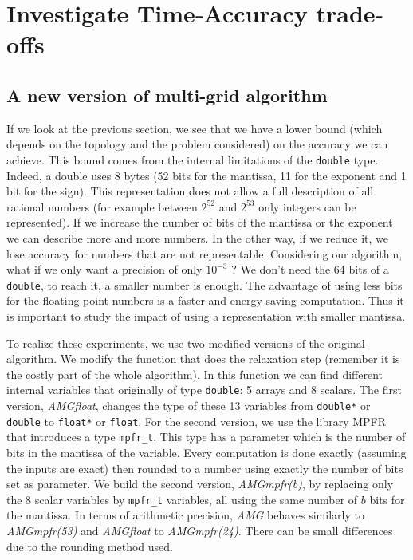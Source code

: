 \documentclass[a4paper,10pt]{article}
\begin{document}
\section{Investigate Time-Accuracy trade-offs}
   
   \subsection{A new version of multi-grid algorithm}
   If we look at the previous section, we see that we have a lower bound (which depends on the topology and the problem considered) on the accuracy we can achieve. This bound comes from the internal limitations of the \texttt{double} type.
   Indeed, a double uses 8 bytes (52 bits for the mantissa, 11 for the exponent and 1 bit for the sign). This representation does not allow a full description of all rational numbers (for example between $2^{52}$ and $2^{53}$ only integers can be represented).
   If we increase the number of bits of the mantissa or the exponent we can describe more and more numbers. In the other way, if we reduce it, we lose accuracy for numbers that are not representable. Considering our algorithm, what if we only want
   a precision of only $10^{-3}$ ? We don't need the 64 bits of a \texttt{double}, to reach it, a smaller number is enough. The advantage of using less bits for the floating point numbers is a faster and energy-saving computation. Thus it is important
   to study the impact of using a representation with smaller mantissa.
   
   To realize these experiments, we use two modified versions of the original algorithm. We modify the function that does the relaxation step (remember it is the costly part of the whole algorithm).
   In this function we can find different internal variables that originally of type \texttt{double}: 5 arrays and 8 scalars. The first version, \emph{AMGfloat}, changes the type of these 13 variables from \texttt{double*} or \texttt{double}
   to \texttt{float*} or \texttt{float}. For the second version, we use the library MPFR~\cite{MPFR,MPFR_link} that introduces a type \texttt{mpfr\_t}. This type has a parameter which is the number of bits in the mantissa of the variable.
   Every computation is done exactly (assuming the inputs are exact) then rounded to a number using exactly the number of bits set as parameter. We build the second version, \emph{AMGmpfr(b)}, by replacing only the 8 scalar variables
   by \texttt{mpfr\_t} variables, all using the same number of $b$ bits for the mantissa. In terms of arithmetic precision, \emph{AMG} behaves similarly to \emph{AMGmpfr(53)} and \emph{AMGfloat} to \emph{AMGmpfr(24)}. There can be small differences
   due to the rounding method used.
   
\end{document}
